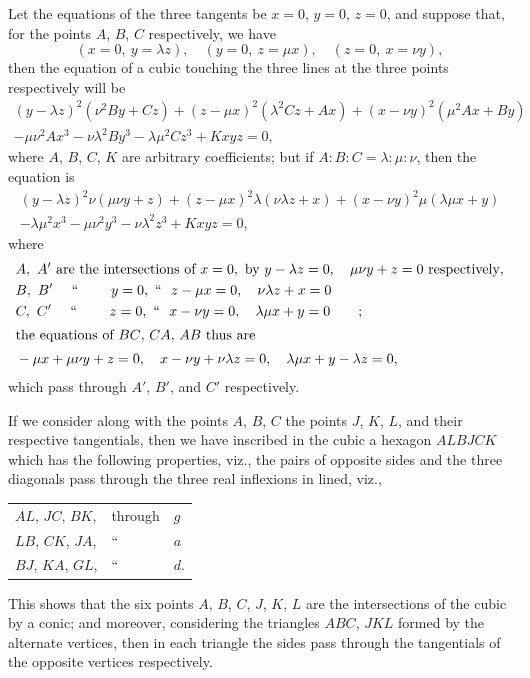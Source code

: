 \documentclass[12pt,a4paper]{article}
\theoremstyle{plain}
\begin{document}
Let the equations of the three tangents be $x=0$, $y=0$, $z=0$, and suppose that, for the points $A$, $B$, $C$ respectively, we have
\[(x=0,\ y=\lambda z),\quad (y=0,\ z=\mu x),\quad (z=0,\ x=\nu y),\]
then the equation of a cubic touching the three lines at the three points respectively will be
\begin{multline*}
(y-\lambda z)^2(\nu^2By+Cz) + (z-\mu x)^2(\lambda^2Cz+Ax) + (x-\nu y)^2(\mu^2Ax+By) \\
- \mu\nu^2Ax^3 - \nu\lambda^2By^3 - \lambda\mu^2Cz^3 + Kxyz = 0,
\end{multline*}
where $A$, $B$, $C$, $K$ are arbitrary coefficients; but if $A:B:C = \lambda:\mu:\nu$, then the equation is
\begin{multline*}
(y-\lambda z)^2\nu(\mu\nu y+z) + (z-\mu x)^2\lambda(\nu\lambda z+x) + (x-\nu y)^2\mu(\lambda\mu x+y) \\
- \lambda\mu^2x^3 - \mu\nu^2y^3 - \nu\lambda^2z^3 + Kxyz = 0,
\end{multline*}
where
\begin{align*}
&A,\ A'\text{ are the intersections of }x=0,\text{ by }y-\lambda z=0,\quad \mu\nu y+z=0\text{ respectively},\\
&B,\ B'\ \ \ \ \text{``\ \ \ \ \ \ \ }y=0,\ \text{``\ \ }z-\mu x=0,\quad \nu\lambda z+x=0\\
&C,\ C'\ \ \ \ \text{``\ \ \ \ \ \ \ }z=0,\ \text{``\ \ }x-\nu y=0,\quad \lambda\mu x+y=0\qquad\text{;}\\
\intertext{the equations of $BC$, $CA$, $AB$ thus are}
&-\mu x+\mu\nu y+z=0,\quad x-\nu y+\nu\lambda z=0,\quad \lambda\mu x+y-\lambda z=0,
\end{align*}
which pass through $A'$, $B'$, and $C'$ respectively.

If we consider along with the points $A$, $B$, $C$ the points $J$, $K$, $L$, and their respective tangentials, then we have inscribed in the cubic a hexagon $ALBJCK$ which has the following properties, viz., the pairs of opposite sides and the three diagonals pass through the three real inflexions in lined, viz.,
\begin{center}
\begin{tabular}{lll}
$AL$, $JC$, $BK$, & through & $g$\\
$LB$, $CK$, $JA$, & `` & $a$\\
$BJ$, $KA$, $GL$, & `` & $d$.
\end{tabular}
\end{center}
This shows that the six points $A$, $B$, $C$, $J$, $K$, $L$ are the intersections of the cubic by a conic; and moreover, considering the triangles $ABC$, $JKL$ formed by the alternate vertices, then in each triangle the sides pass through the tangentials of the opposite vertices respectively.
\end{document}
